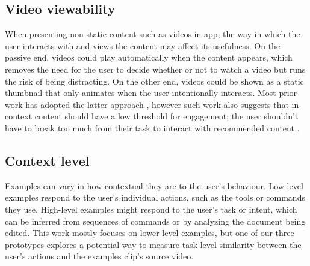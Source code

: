 \subsection{Video viewability}
When presenting non-static content such as videos in-app, the way in which the user interacts with and views the content may affect its usefulness. On the passive end, videos could play automatically when the content appears, which removes the need for the user to decide whether or not to watch a video but runs the risk of being distracting. On the other end, videos could be shown as a static thumbnail that only animates when the user intentionally interacts. Most prior work has adopted the latter approach \cite{Grossman2010a, Chi2012}, however such work also suggests that in-context content should have a low threshold for engagement; the user shouldn't have to break too much from their task to interact with recommended content \cite{Grossman2010a}.

\subsection{Context level}
Examples can vary in how contextual they are to the user's behaviour. Low-level examples respond to the user's individual actions, such as the tools or commands they use. High-level examples might respond to the user's task or intent, which can be inferred from sequences of commands or by analyzing the document being edited. This work mostly focuses on lower-level examples, but one of our three prototypes explores a potential way to measure task-level similarity between the user's actions and the examples clip's source video.